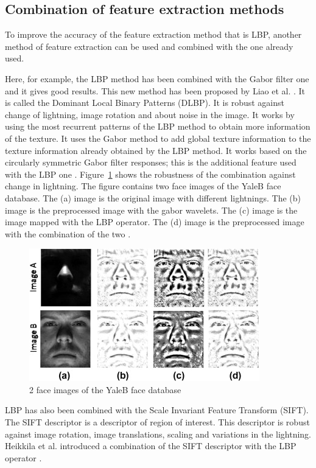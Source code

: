 \subsection{Combination of feature extraction methods}

\vspace{\baselineskip}
\noindent To improve the accuracy of the feature extraction method that is LBP, another method of feature extraction can be used and combined with the one already used. 
\newline

\noindent  Here, for example, the LBP method has been combined with the Gabor filter one and it gives good results. This new method has been proposed by Liao et al. \cite{LIA09}. It is called the Dominant Local Binary Patterns (DLBP). It is robust against change of lightning, image rotation and about noise in the image.  It works by using the most recurrent patterns of the LBP method to obtain more information of the texture. It uses the Gabor method to add global texture information to the texture information already obtained by the LBP method. It works based on the circularly symmetric Gabor filter responses; this is the additional feature used with the LBP one \cite{LIA09}. Figure~\ref{combination_lbp_gabor} shows the robustness of the combination against change in lightning. The figure contains two face images of the YaleB face database. The (a) image is the original image with different lightnings. The (b) image is the preprocessed image with the gabor wavelets. The (c) image is the image mapped with the LBP operator. The (d) image is the preprocessed image with the combination of the two \cite{GOH11}.
\newline

\begin{figure}[!h]
\begin{center}
\noindent \includegraphics[scale=1]{figures/combination_lbp_gabor} 
\newline
\caption{2 face images of the YaleB face database \cite{GOH11}}
\label{combination_lbp_gabor}
\end{center} 
\end{figure}

\noindent  LBP has also been combined with the Scale Invariant Feature Transform (SIFT). The SIFT descriptor is a descriptor of region of interest. This descriptor is robust against image rotation, image translations, scaling and variations in the lightning. Heikkila et al. introduced a combination of the SIFT descriptor with the LBP operator \cite{HEI09}.
\newline
